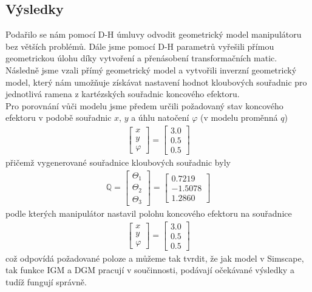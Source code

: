\documentclass{article}
\begin{document}
		\subsection{Výsledky}
			Podařilo se nám pomocí D-H úmluvy odvodit geometrický model manipulátoru bez větších problémů. Dále jsme pomocí D-H parametrů vyřešili přímou geometrickou úlohu díky vytvoření a přenásobení transformačních matic.\\
			Následně jsme vzali přímý geometrický model a vytvořili inverzní geometrický model, který nám umožňuje 
			získávat nastavení hodnot kloubových souřadnic pro jednotlivá ramena z kartézských souřadnic koncového efektoru.\\
			Pro porovnání vůči modelu jsme předem určili požadovaný stav koncového efektoru v podobě souřadnic \(x\), \(y\) a úhlu natočení \(\varphi\) (v modelu proměnná \(q\))
				\begin{align}
					\begin{bmatrix}
						x\\y\\\varphi
					\end{bmatrix}=
					\begin{bmatrix}
						3.0\\0.5\\0.5
					\end{bmatrix}
				\end{align}
			přičemž vygenerované souřadnice kloubových souřadnic byly
				\begin{align}
					\mathbb{Q}=
					\begin{bmatrix}
						\Theta_{1}\\\Theta_{2}\\\Theta_{3}
					\end{bmatrix}=
					\begin{bmatrix}
						0.7219\\
						-1.5078\\
						1.2860
					\end{bmatrix}
				\end{align}
			podle kterých manipulátor nastavil polohu koncového efektoru na souřadnice
				\begin{align}
					\begin{bmatrix}
						x\\y\\\varphi
					\end{bmatrix}=
					\begin{bmatrix}
						3.0\\0.5\\0.5
					\end{bmatrix}
					\label{eq:koncova_poloha}
				\end{align}
			což odpovídá požadované poloze a můžeme tak tvrdit, že jak model v Simscape, tak funkce IGM a DGM pracují v součinnosti, podávají očekávané výsledky a tudíž fungují správně.
\end{document}
